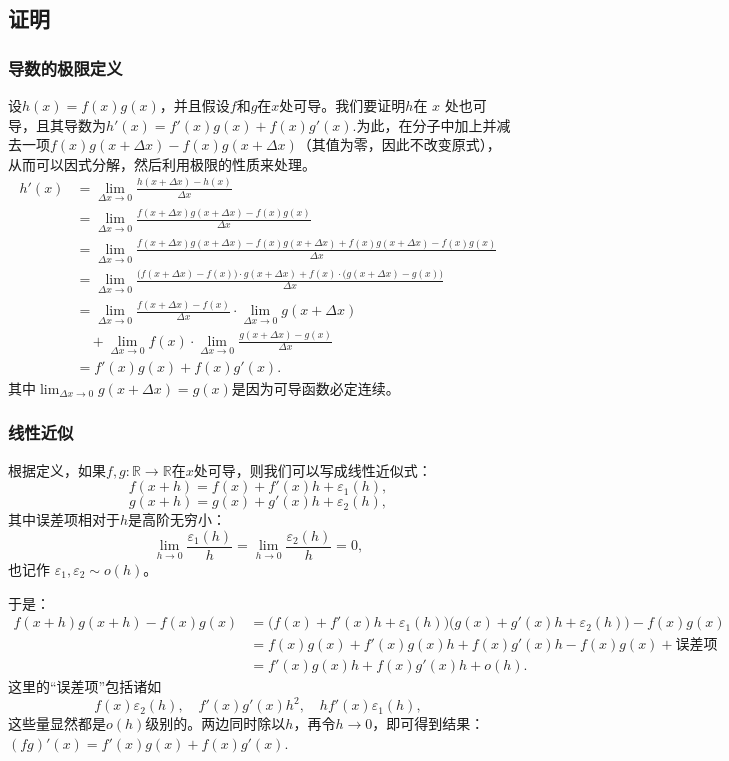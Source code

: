 \subsection{证明}
\subsubsection{导数的极限定义}
设$h(x) = f(x)g(x)$，并且假设$f$和$g$在$x$处可导。我们要证明$h$在 $x$ 处也可导，且其导数为$h'(x) = f'(x)g(x) + f(x)g'(x)$.为此，在分子中加上并减去一项$f(x)g(x+\Delta x) - f(x)g(x+\Delta x)$（其值为零，因此不改变原式），从而可以因式分解，然后利用极限的性质来处理。
$$
\begin{aligned}
h'(x) &= \lim_{\Delta x \to 0} \frac{h(x+\Delta x) - h(x)}{\Delta x} \\[6pt]
&= \lim_{\Delta x \to 0} \frac{f(x+\Delta x)g(x+\Delta x) - f(x)g(x)}{\Delta x} \\[6pt]
&= \lim_{\Delta x \to 0} \frac{f(x+\Delta x)g(x+\Delta x) - f(x)g(x+\Delta x) + f(x)g(x+\Delta x) - f(x)g(x)}{\Delta x} \\[6pt]
&= \lim_{\Delta x \to 0} \frac{\big(f(x+\Delta x)-f(x)\big)\cdot g(x+\Delta x) + f(x)\cdot \big(g(x+\Delta x)-g(x)\big)}{\Delta x} \\[6pt]
&= \lim_{\Delta x \to 0} \frac{f(x+\Delta x)-f(x)}{\Delta x} \cdot \lim_{\Delta x \to 0} g(x+\Delta x) \\ 
&\quad + \lim_{\Delta x \to 0} f(x) \cdot \lim_{\Delta x \to 0} \frac{g(x+\Delta x)-g(x)}{\Delta x} \\[6pt]
&= f'(x)g(x) + f(x)g'(x).
\end{aligned}~
$$
其中$\lim_{\Delta x \to 0} g(x+\Delta x) = g(x)$是因为可导函数必定连续。
\subsubsection{线性近似}
根据定义，如果$f,g:\mathbb{R}\to \mathbb{R}$在$x$处可导，则我们可以写成线性近似式：
$$
f(x+h) = f(x) + f'(x)h + \varepsilon_{1}(h),~
$$
$$
g(x+h) = g(x) + g'(x)h + \varepsilon_{2}(h),~
$$
其中误差项相对于$h$是高阶无穷小：
$$
\lim_{h\to 0}\frac{\varepsilon_{1}(h)}{h} = \lim_{h\to 0}\frac{\varepsilon_{2}(h)}{h} = 0,~
$$
也记作 $\varepsilon_{1}, \varepsilon_{2} \sim o(h)$。

于是：
$$
\begin{aligned}
f(x+h)g(x+h) - f(x)g(x) 
&= \big(f(x) + f'(x)h + \varepsilon_{1}(h)\big)\big(g(x) + g'(x)h + \varepsilon_{2}(h)\big) - f(x)g(x) \\[6pt]
&= f(x)g(x) + f'(x)g(x)h + f(x)g'(x)h - f(x)g(x) + \text{误差项} \\[6pt]
&= f'(x)g(x)h + f(x)g'(x)h + o(h).
\end{aligned}~
$$
这里的“误差项”包括诸如
$$
f(x)\varepsilon_{2}(h), \quad f'(x)g'(x)h^{2}, \quad h f'(x)\varepsilon_{1}(h),~
$$
这些量显然都是$o(h)$级别的。两边同时除以$h$，再令$h \to 0$，即可得到结果：$(fg)'(x) = f'(x)g(x) + f(x)g'(x)$.
